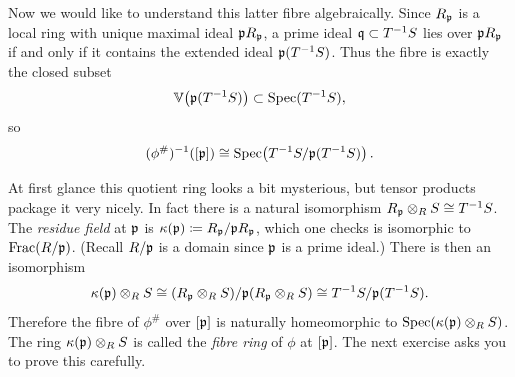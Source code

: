 \documentclass[12pt,reqno]{amsart}
\begin{document}
Now we would like to understand this latter fibre algebraically. Since $R_{\mathfrak{p}}$ is a local ring with unique maximal ideal $\mathfrak{p} R_{\mathfrak{p}}$, a prime ideal $\mathfrak{q}\subset T^{-1}S$ lies over $\mathfrak{p} R_{\mathfrak{p}}$ if and only if it contains the extended ideal $\mathfrak{p}(T^{-1}S)$. Thus the fibre is exactly the closed subset
\[
\mathbb{V}\!\left(\mathfrak{p}(T^{-1}S)\right)\subset \operatorname{Spec}(T^{-1}S),
\]
so
\[
(\phi^{\#})^{-1}([\mathfrak{p}]) \cong \operatorname{Spec}\!\left(T^{-1}S/\mathfrak{p}(T^{-1}S)\right).
\]

At first glance this quotient ring looks a bit mysterious, but tensor products package it very nicely. In fact there is a natural isomorphism $R_{\mathfrak{p}}\otimes_R S \cong T^{-1}S$. The \emph{residue field} at $\mathfrak{p}$ is $\kappa(\mathfrak{p})\coloneqq R_{\mathfrak{p}}/\mathfrak{p} R_{\mathfrak{p}}$, which one checks is isomorphic to $\operatorname{Frac}(R/\mathfrak{p})$. (Recall $R/\mathfrak{p}$ is a domain since $\mathfrak{p}$ is a prime ideal.) There is then an isomorphism
\[
\kappa(\mathfrak{p})\otimes_R S
\cong
(R_{\mathfrak{p}}\otimes_R S)/\mathfrak{p}(R_{\mathfrak{p}}\otimes_R S)
\cong
T^{-1}S/\mathfrak{p}(T^{-1}S).
\]
Therefore the fibre of $\phi^{\#}$ over $[\mathfrak{p}]$ is naturally homeomorphic to $\operatorname{Spec}(\kappa(\mathfrak{p})\otimes_R S)$. The ring $\kappa(\mathfrak{p})\otimes_R S$ is called the \emph{fibre ring} of $\phi$ at $[\mathfrak{p}]$. The next exercise asks you to prove this carefully.

\hrulefill
\end{document}
